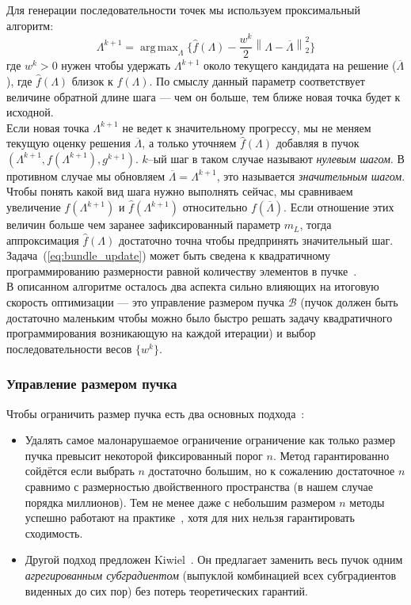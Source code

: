 \documentclass{article}
\DeclareMathOperator*{\argmax}{arg\,max}
\begin{document}
Для генерации последовательности точек мы используем проксимальный алгоритм:\\
\begin{equation}
\Lambda^{k + 1} = \argmax_{\Lambda} \{\hat{f}(\Lambda)  - \frac{w^k}{2} \left \| \Lambda - \overline{\Lambda} \right \|_2^2\}
\label{eq:bundle_update}
\end{equation}
где $w^k > 0$ нужен чтобы удержать $\Lambda^{k + 1}$ около текущего кандидата на решение ($\overline{\Lambda}$), где $\hat{f}(\Lambda)$ близок к $f(\Lambda)$. По смыслу данный параметр соответствует величине обратной длине шага --- чем он больше, тем ближе новая точка будет к исходной.\\
Если новая точка $\Lambda^{k + 1}$ не ведет к значительному прогрессу, мы не меняем текущую оценку решения $\overline{\Lambda}$, а только уточняем $\hat{f}(\Lambda)$ добавляя в пучок $(\Lambda^{k+1}, f(\Lambda^{k+1}), g^{k+1})$. $k$--ый шаг в таком случае называют \textit{нулевым шагом}. В противном случае мы обновляем $\overline{\Lambda} = \Lambda^{k + 1}$, это называется \textit{значительным шагом}. Чтобы понять какой вид шага нужно выполнять сейчас, мы сравниваем увеличение $f(\Lambda^{k+1})$ и $\hat{f}(\Lambda^{k+1})$ относительно $f(\overline{\Lambda})$. Если отношение этих величин больше чем заранее зафиксированный параметр $m_L$, тогда аппроксимация $\hat{f}(\Lambda)$ достаточно точна чтобы предпринять значительный шаг.\\

Задача~(\ref{eq:bundle_update}) может быть сведена к квадратичному программированию размерности равной количеству элементов в пучке~\cite{Bundle}.\\

В описанном алгоритме осталось два аспекта сильно влияющих на итоговую скорость оптимизации --- это управление размером пучка $\mathcal{B}$ (пучок должен быть достаточно маленьким чтобы можно было быстро решать задачу квадратичного программирования возникающую на каждой итерации) и выбор последовательности весов $\{w^k\}$.

\subsubsection{Управление размером пучка}
Чтобы ограничить размер пучка есть два основных подхода~\cite{Bundle}:\\
\begin{itemize}
\item Удалять самое малонарушаемое ограничение ограничение как только размер пучка превысит некоторой фиксированный порог $n$. Метод гарантированно сойдётся если выбрать $n$ достаточно большим, но к сожалению достаточное $n$ сравнимо с размерностью двойственного пространства (в нашем случае порядка миллионов). Тем не менее даже с небольшим размером $n$ методы успешно работают на практике~\cite{Bundle}, хотя для них нельзя гарантировать сходимость.\\
\item Другой подход предложен Kiwiel~\cite{ABundle}. Он предлагает заменить весь пучок одним \emph{агрегированным субградиентом} (выпуклой комбинацией всех субградиентов виденных до сих пор) без потерь теоретических гарантий.
\end{itemize}
\end{document}
